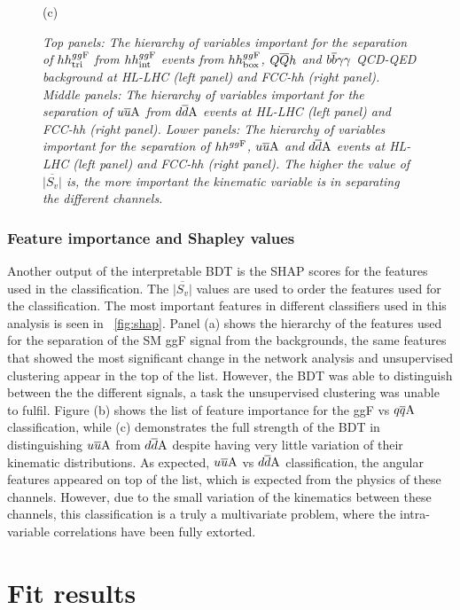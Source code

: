 \begin{figure}[t!]
		{  \footnotesize  (c)}
	\caption{\it Top panels: The hierarchy of variables important for the separation of $hh^{gg\rm F}_{\rm tri}$ from $hh^{gg\rm F}_{\rm int}$ events from $hh^{gg\rm F}_{\rm box}$, $Q\overline Q h$ and $b\overline b\gamma\gamma$ QCD-QED background at HL-LHC (left panel) and FCC-hh (right panel). Middle panels: The hierarchy of variables important for the separation of $u\overline u \rm A$ from $d\overline d \rm A$ events at HL-LHC (left panel) and FCC-hh (right panel). Lower panels: The hierarchy of variables important for the separation of $hh^{gg\rm F}$, $u\overline u \rm A$ and $d\overline d \rm A$ events at HL-LHC (left panel) and FCC-hh (right panel). The higher the value of $\overline{|S_v|}$ is, the more important the kinematic variable is in separating the different channels.}
	\label{fig:shap}
\end{figure}
\FloatBarrier
\subsubsection*{Feature importance and Shapley values}
Another output of the interpretable BDT is the SHAP scores for the features used in the classification.  The $\overline{|S_v|}$ values are used to order the features used for the classification. The most important features in different classifiers used in this analysis is seen in ~\autoref{fig:shap}. Panel (a) shows the hierarchy of the features used for the separation of the SM ggF signal from the backgrounds, the same features that showed the most significant change in the network analysis and unsupervised clustering appear in the top of the list. However, the BDT was able to  distinguish between the the different signals, a task the unsupervised clustering was unable to fulfil. Figure (b) shows the list of feature importance for the ggF vs $q\overline q \rm A$ classification, while (c) demonstrates the full strength of the BDT in distinguishing $u\overline u \rm A$ from $d\overline d \rm A$ despite having very little variation of their kinematic distributions.  As expected, $u\overline u \rm A$ vs $d\overline d \rm A$ classification, the angular features appeared on top of the list, which is expected from the physics of these channels. However, due to the small variation of the kinematics between these channels, this classification is a truly a multivariate problem, where the intra-variable correlations have been fully extorted. 
\section{Fit results\label{sec:resultsly}}

